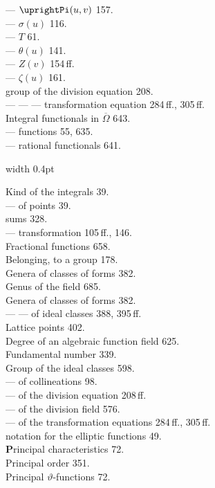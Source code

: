 \begin{minipage}[t]{0.48\textwidth}
--- $\uprightPi(u,v)$ 157. \\
--- $\sigma(u)$ 116. \\
--- $T$ 61. \\
--- $\theta(u)$ 141. \\
--- $Z(v)$ 154\,ff. \\
--- $\zeta(u)$ 161. \\[4pt]
 group of the division equation 208. \\
--- --- --- transformation equation 284\,ff., 305\,ff. \\
Integral functionals in $\overline{\Omega}$ 643. \\
--- functions 55, 635. \\
--- rational functionals 641.
\end{minipage}%
\hfill\vrule width 0.4pt\hfill
\begin{minipage}[t]{0.48\textwidth}
\noindent
Kind of the integrals 39. \\
--- of points 39. \\
 sums 328. \\
--- transformation 105\,ff., 146. \\
Fractional functions 658. \\
Belonging, to a group 178. \\
Genera of classes of forms 382. \\
Genus of the field 685. \\
Genera of classes of forms 382. \\
--- --- of ideal classes 388, 395\,ff. \\
Lattice points 402. \\
Degree of an algebraic function field 625. \\
Fundamental number 339. \\
Group of the ideal classes 598. \\
--- of collineations 98. \\
--- of the division equation 208\,ff. \\
--- of the division field 576. \\
--- of the transformation equations 284\,ff., 305\,ff. \\
 notation for the elliptic functions 49. \\[4pt]
\textbf{P}rincipal characteristics 72. \\
Principal order 351. \\
Principal $\vartheta$-functions 72. \\

\end{minipage}

